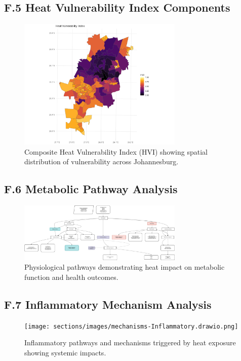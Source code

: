 \graphicspath{{./}{./sections/images/}{./images/}}\documentclass[12pt,a4paper,landscape]{article}
\begin{document}
\subsection*{F.5 Heat Vulnerability Index Components}
\begin{figure}[H]
    \centering
    \includegraphics[width=0.7\textwidth]{sections/images/HVI_map_Johannesburg_prelim_analysis.png}
    \caption{Composite Heat Vulnerability Index (HVI) showing spatial distribution of vulnerability across Johannesburg.}
    \label{fig:hvi}
\end{figure}

\subsection*{F.6 Metabolic Pathway Analysis}
\begin{figure}[H]
    \centering
    \includegraphics[width=0.7\textwidth]{sections/images/Timeline-Heat_health_mechanisms.drawio.png}
    \caption{Physiological pathways demonstrating heat impact on metabolic function and health outcomes.}
    \label{fig:metabolic}
\end{figure}

\subsection*{F.7 Inflammatory Mechanism Analysis}
\begin{figure}[H]
    \centering
    \texttt{[image: sections/images/mechanisms-Inflammatory.drawio.png]}
    \caption{Inflammatory pathways and mechanisms triggered by heat exposure showing systemic impacts.}
    \label{fig:inflammatory}
\end{figure}
\end{document}
